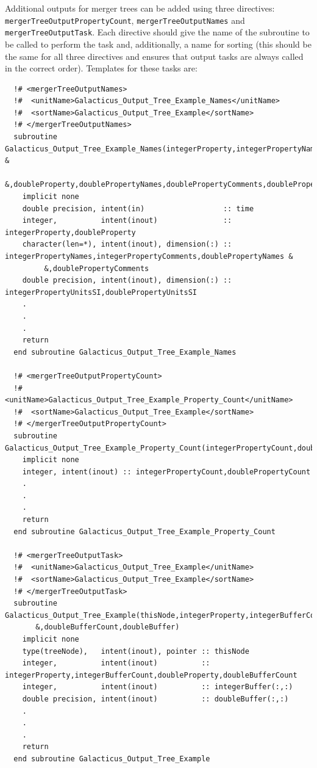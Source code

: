 Additional outputs for merger trees can be added using three directives: {\tt mergerTreeOutputPropertyCount}, {\tt mergerTreeOutputNames} and {\tt mergerTreeOutputTask}. Each directive should give the name of the subroutine to be called to perform the task and, additionally, a name for sorting (this should be the same for all three directives and ensures that output tasks are always called in the correct order). Templates for these tasks are:
\begin{verbatim}
  !# <mergerTreeOutputNames>
  !#  <unitName>Galacticus_Output_Tree_Example_Names</unitName>
  !#  <sortName>Galacticus_Output_Tree_Example</sortName>
  !# </mergerTreeOutputNames>
  subroutine Galacticus_Output_Tree_Example_Names(integerProperty,integerPropertyNames,integerPropertyComments,integerPropertyUnitsSI &
       &,doubleProperty,doublePropertyNames,doublePropertyComments,doublePropertyUnitsSI,time)
    implicit none
    double precision, intent(in)                  :: time
    integer,          intent(inout)               :: integerProperty,doubleProperty
    character(len=*), intent(inout), dimension(:) :: integerPropertyNames,integerPropertyComments,doublePropertyNames &
         &,doublePropertyComments
    double precision, intent(inout), dimension(:) :: integerPropertyUnitsSI,doublePropertyUnitsSI
    .
    .
    .
    return
  end subroutine Galacticus_Output_Tree_Example_Names

  !# <mergerTreeOutputPropertyCount>
  !#  <unitName>Galacticus_Output_Tree_Example_Property_Count</unitName>
  !#  <sortName>Galacticus_Output_Tree_Example</sortName>
  !# </mergerTreeOutputPropertyCount>
  subroutine Galacticus_Output_Tree_Example_Property_Count(integerPropertyCount,doublePropertyCount)
    implicit none
    integer, intent(inout) :: integerPropertyCount,doublePropertyCount
    .
    .
    .
    return
  end subroutine Galacticus_Output_Tree_Example_Property_Count

  !# <mergerTreeOutputTask>
  !#  <unitName>Galacticus_Output_Tree_Example</unitName>
  !#  <sortName>Galacticus_Output_Tree_Example</sortName>
  !# </mergerTreeOutputTask>
  subroutine Galacticus_Output_Tree_Example(thisNode,integerProperty,integerBufferCount,integerBuffer,doubleProperty&
       &,doubleBufferCount,doubleBuffer)
    implicit none
    type(treeNode),   intent(inout), pointer :: thisNode
    integer,          intent(inout)          :: integerProperty,integerBufferCount,doubleProperty,doubleBufferCount
    integer,          intent(inout)          :: integerBuffer(:,:)
    double precision, intent(inout)          :: doubleBuffer(:,:)
    .
    .
    .
    return
  end subroutine Galacticus_Output_Tree_Example
\end{verbatim}
